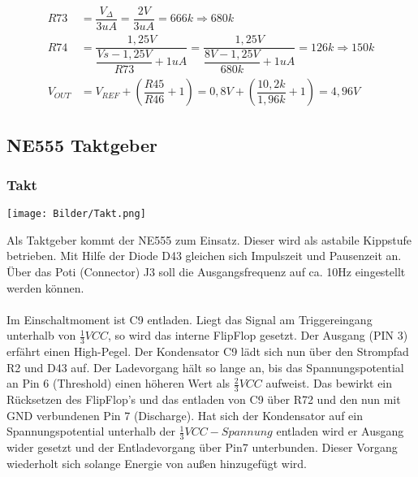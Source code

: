 \documentclass[a4paper,11pt]{scrartcl}
\begin{document}
\begin{center}
\begin{align}
	R73 &= \dfrac{V_{\Delta}}{3uA} = \dfrac{2V}{3uA} = 666k  \Rightarrow 680k\\
	R74 &= \dfrac{1,25V}{\dfrac{Vs - 1,25V}{R73} + 1uA} = \dfrac{1,25V}{\dfrac{8V - 1,25V}{680k} + 1uA} = 126k \Rightarrow 150k	\\
	V_{OUT}	&= V_{REF} + (\dfrac{R45}{R46} + 1) = 0,8V + (\dfrac{10,2k}{1,96k} + 1) = 4,96V
\end{align}
\end{center}


\newpage


\subsection{NE555 Taktgeber}

\subsubsection{Takt}

\begin{center}
\texttt{[image: Bilder/Takt.png]}
\end{center}

Als Taktgeber kommt der \glqq NE555 \grqq{} zum Einsatz. Dieser wird als astabile Kippstufe betrieben. Mit Hilfe der Diode D43 gleichen sich Impulszeit und Pausenzeit an. Über das Poti (Connector) J3 soll die Ausgangsfrequenz auf ca. 10Hz eingestellt werden können. 
\\
\\
Im Einschaltmoment ist C9 entladen. Liegt das Signal am Triggereingang unterhalb von $\frac{1}{3} VCC$, so wird das interne FlipFlop gesetzt. Der Ausgang (PIN 3) erfährt einen High-Pegel. Der Kondensator C9 lädt sich nun über den Strompfad R2 und D43 auf. Der Ladevorgang hält so lange an, bis das Spannungspotential an Pin 6 (Threshold) einen höheren Wert als $\frac{2}{3} VCC$ aufweist. Das bewirkt ein Rücksetzen des FlipFlop's und das entladen von C9 über R72 und den nun \glqq mit GND verbundenen\grqq{} Pin 7 (Discharge). Hat sich der Kondensator auf ein Spannungspotential unterhalb der $\frac{1}{3} VCC-Spannung$ entladen wird er Ausgang wider gesetzt und der Entladevorgang über Pin7 unterbunden. Dieser Vorgang wiederholt sich solange Energie von außen hinzugefügt wird. 
\end{document}
